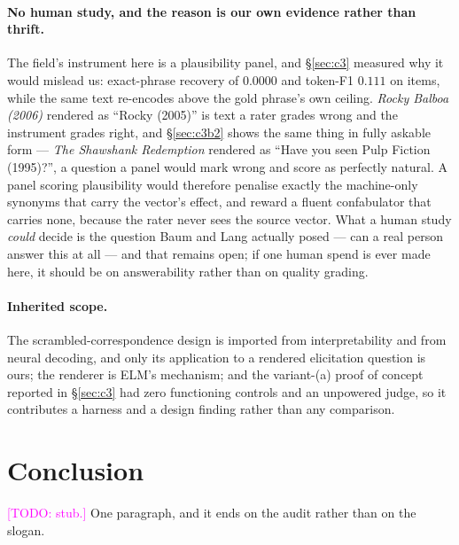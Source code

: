 \documentclass[11pt]{article}
\newcommand{\todo}[1]{\textcolor{magenta}{[TODO: #1]}}
\begin{document}
\paragraph{No human study, and the reason is our own evidence rather than thrift.} The field's
instrument here is a plausibility panel, and \S\ref{sec:c3} measured why it would mislead us:
exact-phrase recovery of $0.0000$ and token-F1 $0.111$ on items, while the same text re-encodes above
the gold phrase's own ceiling. \emph{Rocky Balboa (2006)} rendered as ``Rocky (2005)'' is text a
rater grades wrong and the instrument grades right, and \S\ref{sec:c3b2} shows the same thing in
fully askable form --- \emph{The Shawshank Redemption} rendered as ``Have you seen Pulp Fiction
(1995)?'', a question a panel would mark wrong and score as perfectly natural. A panel scoring plausibility would therefore
penalise exactly the machine-only synonyms that carry the vector's effect, and reward a fluent
confabulator that carries none, because the rater never sees the source vector. What a human study
\emph{could} decide is the question Baum and Lang actually posed --- can a real person answer this at
all --- and that remains open; if one human spend is ever made here, it should be on answerability
rather than on quality grading.

\paragraph{Inherited scope.} The scrambled-correspondence design is imported from interpretability
and from neural decoding, and only its application to a rendered elicitation question is ours; the
renderer is ELM's mechanism; and the variant-(a) proof of concept reported in \S\ref{sec:c3} had zero
functioning controls and an unpowered judge, so it contributes a harness and a design finding rather
than any comparison.

\section{Conclusion}
\label{sec:conclusion}

\todo{stub.} One paragraph, and it ends on the audit rather than on the slogan.



\end{document}
